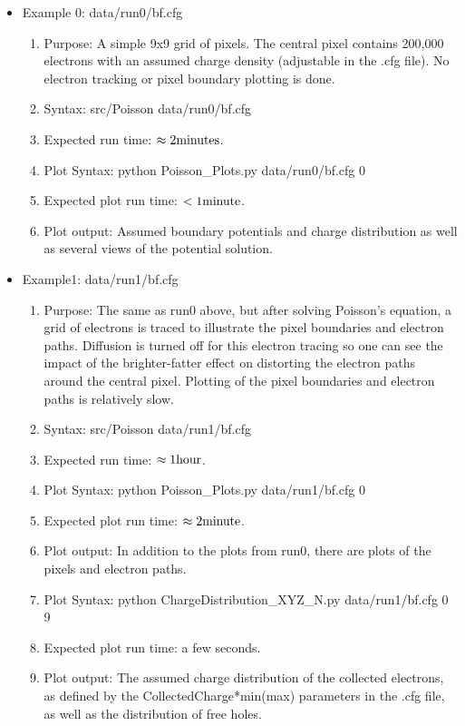 \documentclass{article} %
\begin{document}
\begin{itemize}
  \item Example 0: data/run0/bf.cfg
    \begin{enumerate}
      \item Purpose: A simple 9x9 grid of pixels.  The central pixel contains 200,000 electrons with an assumed charge density (adjustable in the .cfg file).  No electron tracking or pixel boundary plotting is done.  
      \item Syntax: src/Poisson data/run0/bf.cfg
      \item Expected run time: $\rm \approx 2 minutes$.
      \item Plot Syntax: python Poisson\_Plots.py data/run0/bf.cfg 0
      \item Expected plot run time: $\rm <1 minute$.
      \item Plot output: Assumed boundary potentials and charge distribution as well as several views of the potential solution. 
    \end{enumerate}

      \item Example1: data/run1/bf.cfg
    \begin{enumerate}
      \item Purpose: The same as run0 above, but after solving Poisson's equation, a grid of electrons is traced to illustrate the pixel boundaries and electron paths. Diffusion is turned off for this electron tracing so one can see the impact of the brighter-fatter effect on distorting the electron paths around the central pixel.  Plotting of the pixel boundaries and electron paths is relatively slow.
      \item Syntax: src/Poisson data/run1/bf.cfg
      \item Expected run time: $\rm \approx 1 hour$.
      \item Plot Syntax: python Poisson\_Plots.py data/run1/bf.cfg 0
      \item Expected plot run time: $\rm \approx 2 minute$.
      \item Plot output: In addition to the plots from run0, there are plots of the pixels and electron paths.        
      \item Plot Syntax: python ChargeDistribution\_XYZ\_N.py data/run1/bf.cfg 0 9
      \item Expected plot run time: a few seconds.
      \item Plot output: The assumed charge distribution of the collected electrons, as defined by the CollectedCharge*min(max) parameters in the .cfg file, as well as the distribution of free holes.
    \end{enumerate}


\end{itemize}
\end{document}

